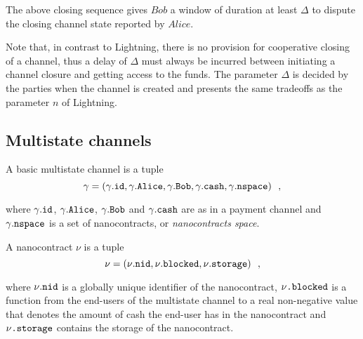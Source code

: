     The above closing sequence gives $Bob$ a window of duration at least $\Delta$ to
    dispute the closing channel state reported by $Alice$.

    Note that, in contrast to Lightning, there is no provision for cooperative closing of
    a channel, thus a delay of $\Delta$ must always be incurred between initiating a
    channel closure and getting access to the funds. The parameter $\Delta$ is decided by
    the parties when the channel is created and presents the same tradeoffs as the
    parameter $n$ of Lightning.

  \subsection{Multistate channels}
    A basic multistate channel is a tuple
    \begin{equation*}
      \gamma = \left(\gamma\mbox{.\texttt{id}}, \gamma\mbox{.\texttt{Alice}},
      \gamma\mbox{.\texttt{Bob}}, \gamma\mbox{.\texttt{cash}},
      \gamma\mbox{.\texttt{nspace}}\right) \enspace,
    \end{equation*}

    where $\gamma\mbox{.\texttt{id}}$, $\gamma\mbox{.\texttt{Alice}}$,
    $\gamma\mbox{.\texttt{Bob}}$ and $\gamma\mbox{.\texttt{cash}}$ are as in a payment
    channel and $\gamma\mbox{.\texttt{nspace}}$ is a set of nanocontracts, or
    \textit{nanocontracts space}.

    A nanocontract $\nu$ is a tuple
    \begin{equation*}
      \nu = \left(\nu\mbox{.\texttt{nid}}, \nu\mbox{.\texttt{blocked}},
      \nu\mbox{.\texttt{storage}}\right) \enspace,
    \end{equation*}

    where $\nu\mbox{.\texttt{nid}}$ is a globally unique identifier of the nanocontract,
    $\nu\mbox{\texttt{.blocked}}$ is a function from the end-users of the multistate
    channel to a real non-negative value that denotes the amount of cash the end-user has
    in the nanocontract and $\nu\mbox{\texttt{.storage}}$ contains the storage of the
    nanocontract.
